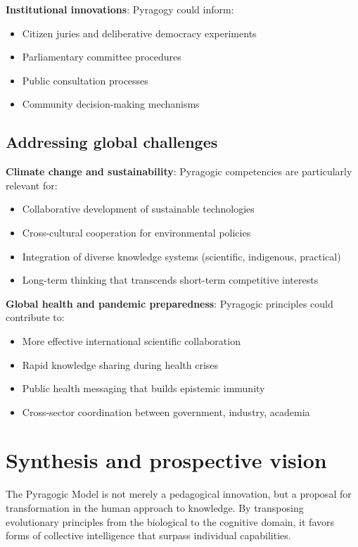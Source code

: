 \textbf{Institutional innovations}:
Pyragogy could inform:
\begin{itemize}
	\item Citizen juries and deliberative democracy experiments
	\item Parliamentary committee procedures
	\item Public consultation processes
	\item Community decision-making mechanisms
\end{itemize}

\subsection{Addressing global challenges}

\textbf{Climate change and sustainability}:
Pyragogic competencies are particularly relevant for:
\begin{itemize}
	\item Collaborative development of sustainable technologies
	\item Cross-cultural cooperation for environmental policies
	\item Integration of diverse knowledge systems (scientific, indigenous, practical)
	\item Long-term thinking that transcends short-term competitive interests
\end{itemize}

\textbf{Global health and pandemic preparedness}:
Pyragogic principles could contribute to:
\begin{itemize}
	\item More effective international scientific collaboration
	\item Rapid knowledge sharing during health crises
	\item Public health messaging that builds epistemic immunity
	\item Cross-sector coordination between government, industry, academia
\end{itemize}

\section{Synthesis and prospective vision}

The Pyragogic Model is not merely a pedagogical innovation, but a proposal for transformation in the human approach to knowledge. By transposing evolutionary principles from the biological to the cognitive domain, it favors forms of collective intelligence that surpass individual capabilities.

